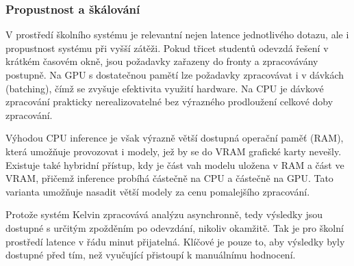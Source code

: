\subsubsection*{Propustnost a škálování}
\label{subsubsec:llm-computational-cost-throughput-scaling}

V prostředí školního systému je relevantní nejen latence jednotlivého dotazu, ale i propustnost systému při vyšší zátěži.
Pokud třicet studentů odevzdá řešení v krátkém časovém okně, jsou požadavky zařazeny do fronty a zpracovávány postupně.
Na GPU s dostatečnou pamětí lze požadavky zpracovávat i v dávkách (batching), čímž se zvyšuje efektivita využití hardware.
Na CPU je dávkové zpracování prakticky nerealizovatelné bez výrazného prodloužení celkové doby zpracování.

Výhodou CPU inference je však výrazně větší dostupná operační paměť (RAM), která umožňuje provozovat i modely, jež by se do VRAM grafické karty nevešly.
Existuje také hybridní přístup, kdy je část vah modelu uložena v RAM a část ve VRAM, přičemž inference probíhá částečně na CPU a částečně na GPU\@.
Tato varianta umožňuje nasadit větší modely za cenu pomalejšího zpracování.

Protože systém Kelvin zpracovává analýzu asynchronně, tedy výsledky jsou dostupné s určitým zpožděním po odevzdání, nikoliv okamžitě.
Tak je pro školní prostředí latence v řádu minut přijatelná.
Klíčové je pouze to, aby výsledky byly dostupné před tím, než vyučující přistoupí k manuálnímu hodnocení.

\endinput